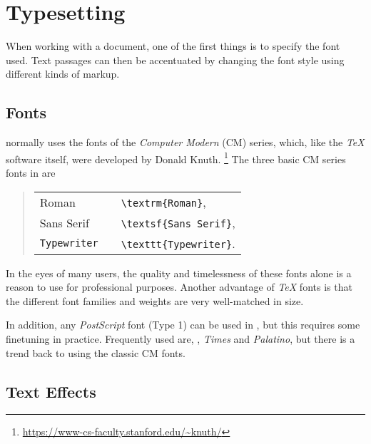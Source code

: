 \section{Typesetting}

When working with a \latex document, one of the first things is to specify the
font used. Text passages can then be accentuated by changing the font style
using different kinds of markup.

\subsection{Fonts}

\latex normally uses the fonts of the \emph{Computer Modern} (CM) series, which,
like the \emph{TeX} software itself, were developed by Donald Knuth.%
\footnote{\url{https://www-cs-faculty.stanford.edu/~knuth/}}
The three basic CM series fonts in \latex are
%
\begin{quote}
    \begin{tabular}{lcl}
        \textrm{Roman}      & & \verb!\textrm{Roman}!,      \\
        \textsf{Sans Serif} & & \verb!\textsf{Sans Serif}!, \\
        \texttt{Typewriter} & & \verb!\texttt{Typewriter}!.
    \end{tabular}
\end{quote}
%
In the eyes of many users, the quality and timelessness of these fonts alone is
a reason to use \latex for professional purposes. Another advantage of
\emph{TeX} fonts is that the different font families and weights are very
well-matched in size.

In addition, any \emph{PostScript} font (Type 1) can be used in \latex, but this
requires some finetuning in practice. Frequently used are, \eg, \emph{Times}
and \emph{Palatino}, but there is a trend back to using the classic CM fonts.

\subsection{Text Effects}

